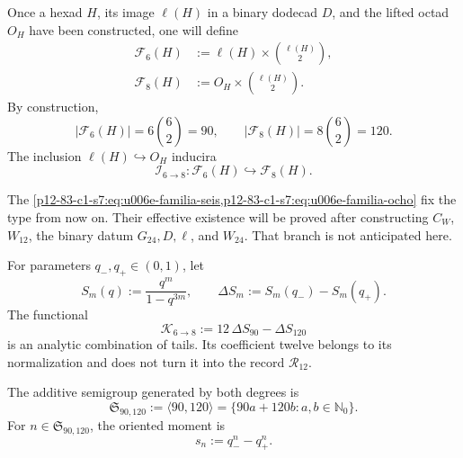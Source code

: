 {\begin{definition}
\label{p12-83-c1-s7:def:u006e-familias-incidencia}
Once a hexad \(H\), its image
\(\ell(H)\) in a binary dodecad \(D\), and the lifted octad
\(O_H\) have been constructed, one will define
\begin{align}
 \mathcal F_6(H)
 &:=\ell(H)\times\binom{\ell(H)}2,
 \label{p12-83-c1-s7:eq:u006e-familia-seis}\\
 \mathcal F_8(H)
 &:=O_H\times\binom{\ell(H)}2.
 \label{p12-83-c1-s7:eq:u006e-familia-ocho}
\end{align}
By construction,
\begin{equation}
 |\mathcal F_6(H)|
 =6\binom62=90,
 \qquad
 |\mathcal F_8(H)|
 =8\binom62=120.
 \label{p12-83-c1-s7:eq:u006e-cardinales-incidencia}
\end{equation}
The inclusion \(\ell(H)\hookrightarrow O_H\) inducira
\begin{equation}
 \mathcal I_{6\to8}:
 \mathcal F_6(H)\hookrightarrow\mathcal F_8(H).
 \label{p12-83-c1-s7:eq:u006e-inclusion-incidencia}
\end{equation}
\end{definition}

The \cref{p12-83-c1-s7:eq:u006e-familia-seis,p12-83-c1-s7:eq:u006e-familia-ocho} fix the
type from now on. Their effective existence will be proved after constructing
\(C_W\), \(W_{12}\), the binary datum \(G_{24},D,\ell\), and \(W_{24}\).
That branch is not anticipated here.

\begin{definition}
\label{p12-83-c1-s7:def:u006e-combinacion-colas}
For parameters \(q_-,q_+\in(0,1)\), let
\begin{equation}
 S_m(q):=\frac{q^m}{1-q^{3m}},
 \qquad
 \Delta S_m:=S_m(q_-)-S_m(q_+).
 \label{p12-83-c1-s7:eq:u006e-colas-normalizadas}
\end{equation}
The functional
\begin{equation}
 \mathcal K_{6\to8}
 :=12\,\Delta S_{90}-\Delta S_{120}
 \label{p12-83-c1-s7:eq:u006e-funcional-seis-ocho}
\end{equation}
is an analytic combination of tails. Its coefficient twelve belongs to its
normalization and does not turn it into the record
\(\mathcal R_{12}\).
\end{definition}

\begin{definition}
\label{p12-83-c1-s7:def:u006e-semigrupo-momentos}
The additive semigroup generated by both degrees is
\begin{equation}
 \mathfrak S_{90,120}
 :=\langle90,120\rangle
 =\{90a+120b:a,b\in\mathbb N_0\}.
 \label{p12-83-c1-s7:eq:u006e-semigrupo}
\end{equation}
For \(n\in\mathfrak S_{90,120}\), the oriented moment is
\begin{equation}
 s_n:=q_-^n-q_+^n.
 \label{p12-83-c1-s7:eq:u006e-momento}
\end{equation}
\end{definition}

}
